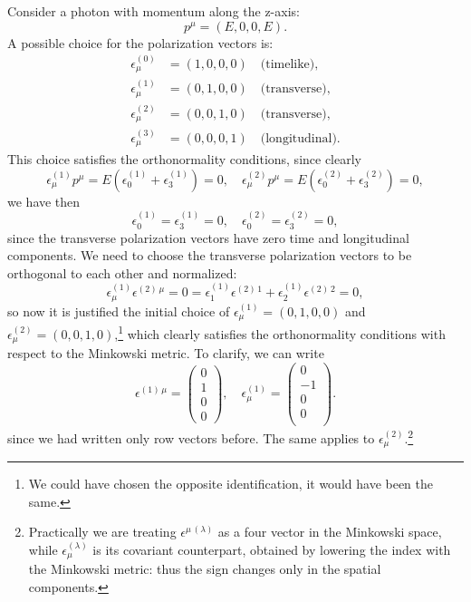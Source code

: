 \begin{example}
    Consider a photon with momentum along the z-axis:
    \[
        p^{\mu} = (E, 0, 0, E).
    \]
    A possible choice for the polarization vectors is:
    \[
        \begin{aligned}
            \epsilon^{(0)}_{\mu} & = (1, 0, 0, 0) \quad \text{(timelike)},     \\
            \epsilon^{(1)}_{\mu} & = (0, 1, 0, 0) \quad \text{(transverse)},   \\
            \epsilon^{(2)}_{\mu} & = (0, 0, 1, 0) \quad \text{(transverse)},   \\
            \epsilon^{(3)}_{\mu} & = (0, 0, 0, 1) \quad \text{(longitudinal)}.
        \end{aligned}
    \]
    This choice satisfies the orthonormality conditions, since clearly
    \[
        \epsilon^{(1)}_{\mu} p^{\mu} = E \left(\epsilon^{(1)}_{0} + \epsilon^{(1)}_{3}\right) = 0, \quad \epsilon^{(2)}_{\mu} p^{\mu} = E \left(\epsilon^{(2)}_{0} + \epsilon^{(2)}_{3}\right) = 0,
    \]
    we have then
    \[
        \epsilon^{(1)}_0 = \epsilon^{(1)}_3 = 0, \quad \epsilon^{(2)}_0 = \epsilon^{(2)}_3 = 0,
    \]
    since the transverse polarization vectors have zero time and longitudinal components. We need to choose the transverse polarization vectors to be orthogonal to each other and normalized:
    \[
        \epsilon^{(1)}_{\mu} \epsilon^{(2)\,\mu} = 0 = \epsilon^{(1)}_1 \epsilon^{(2)\,1} + \epsilon^{(1)}_2 \epsilon^{(2)\,2} = 0,
    \]
    so now it is justified the initial choice of \(\epsilon^{(1)}_{\mu} = (0, 1, 0, 0)\) and \(\epsilon^{(2)}_{\mu} = (0, 0, 1, 0)\),\footnote{We could have chosen the opposite identification, it would have been the same.} which clearly satisfies the orthonormality conditions with respect to the Minkowski metric. To clarify, we can write
    \[
        \epsilon^{(1)\,\mu} = \begin{pmatrix}
            0 \\
            1 \\
            0 \\
            0
        \end{pmatrix}, \quad \epsilon^{(1)}_{\mu} = \begin{pmatrix}
            0  \\
            -1 \\
            0  \\
            0  \\
        \end{pmatrix}.
    \]
    since we had written only row vectors before. The same applies to \(\epsilon^{(2)}_{\mu}\).\footnote{Practically we are treating \(\epsilon^{\mu\,(\lambda)}\) as a four vector in the Minkowski space, while \(\epsilon_{\mu}^{(\lambda)}\) is its covariant counterpart, obtained by lowering the index with the Minkowski metric: thus the sign changes only in the spatial components.}
\end{example}

